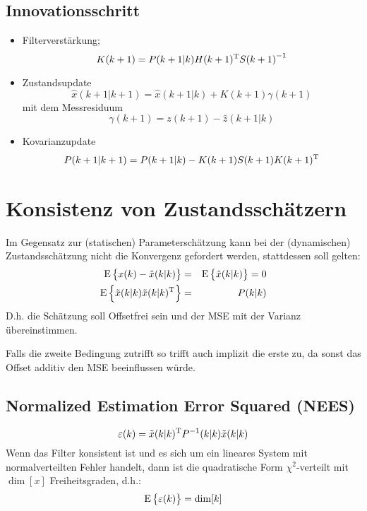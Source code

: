 \subsection{Innovationsschritt}
\begin{itemize}
    \item Filterverstärkung;
        \begin{equation*}
            K(k+1) = P(k+1|k) H(k+1)^\text{T} {S(k+1)}^{-1}
        \end{equation*}
    \item Zustandsupdate
        \begin{equation*}
            \hat{x}(k+1|k+1) = \hat{x}(k+1|k) + K(k+1) \gamma(k+1)
        \end{equation*}
        mit dem Messresiduum
        \begin{equation*}
            \gamma(k+1) = z(k+1) - \hat{z}(k+1|k)
        \end{equation*}
    \item Kovarianzupdate
        \begin{equation*}
            P(k+1|k+1) = P(k+1|k) - K(k+1) S(k+1) K(k+1)^\text{T}
        \end{equation*}
\end{itemize}

\section{Konsistenz von Zustandsschätzern}
Im Gegensatz zur (statischen) Parameterschätzung kann bei der (dynamischen) Zustandsschätzung nicht die Konvergenz gefordert werden, stattdessen soll gelten:
\begin{eqnarray*}
    \operatorname*{E}\left\{x(k) - \hat{x}(k|k)\right\} &=& \operatorname*{E}\left\{\hat{x}(k|k)\right\} = 0 \\
    \operatorname*{E}\left\{\tilde{x}(k|k) \tilde{x}(k|k)^\text{T}\right\} &=& P(k|k) 
\end{eqnarray*}
D.h. die Schätzung soll Offsetfrei sein und der MSE mit der Varianz übereinstimmen.

Falls die zweite Bedingung zutrifft so trifft auch implizit die erste zu, da sonst das Offset additiv den MSE beeinflussen würde.

\subsection{Normalized Estimation Error Squared (NEES)}
\begin{equation*}
    \varepsilon(k) = \tilde{x}(k|k)^\text{T} P^{-1}(k|k)\tilde{x}(k|k)
\end{equation*}
Wenn das Filter konsistent ist und es sich um ein lineares System mit normalverteilten Fehler handelt, dann ist die quadratische Form $\chi^2$-verteilt mit $\dim[x]$ Freiheitsgraden, d.h.:
\begin{equation*}
    \operatorname*{E}\left\{\varepsilon(k)\right\} = \dim[k]
\end{equation*}

